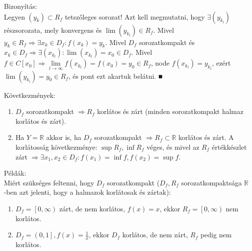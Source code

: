\documentclass[12pt,a4paper]{scrartcl}
\providecommand{\tightlist}{%
  \setlength{\itemsep}{0pt}\setlength{\parskip}{0pt}}
\newenvironment{bizonyitas}{}{}
\newenvironment{pelda}{}{}
\begin{document}
\begin{bizonyitas}

Bizonyítás:\\
Legyen \(\left( y_{k} \right) \subset R_{f}\) tetszőleges sorozat! Azt
kell megmutatni, hogy \(\exists\left( y_{k_{l}} \right)\) részsorozata,
mely konvergens és \(\lim\left( y_{k_{l}} \right) \in R_{f}\). Mivel
\(\left. y_{k} \in R_{f}\Rightarrow\exists x_{k} \in D_{f}:f\left( x_{k} \right) = y_{k} \right.\).
Mivel \(D_{f}\) sorozatkompakt és
\(\left. x_{k} \in D_{f}\Rightarrow\exists\left( x_{k_{l}} \right):\lim\left( x_{k_{l}} \right) = x_{0} \in D_{f} \right.\).
Mivel
\(\left. f \in C\left\lbrack x_{0} \right\rbrack\Rightarrow\underset{l\rightarrow\infty}{\lim}f\left( x_{k_{l}} \right) = f\left( x_{0} \right) = y_{0} \in R_{f} \right.\),
node \(f\left( x_{k_{l}} \right) = y_{k_{l}}\), ezért
\(\lim\left( y_{k_{l}} \right) = y_{0} \in R_{f}\), és pont ezt akartuk
belátni. ■

\end{bizonyitas}

Következmények:

\begin{enumerate}
\def\labelenumi{\arabic{enumi}.}
\tightlist
\item
  \(D_{f}\) sorozatkompakt \(\left. \Rightarrow R_{f} \right.\) korlátos
  és zárt (minden sorozatkompakt halmaz korlátos és zárt).
\item
  Ha \(Y = {\mathbb{R}}\) akkor is, ha \(D_{f}\) sorozatkompakt
  \(\left. \Rightarrow R_{f} \subset {\mathbb{R}} \right.\) korlátos és
  zárt. A korlátosság következménye: \(\sup R_{f},\inf R_{f}\) véges, és
  mivel az \(R_{f}\) értékkészlet zárt
  \(\left. \Rightarrow\exists x_{1},x_{2} \in D_{f}:f\left( x_{1} \right) = \inf f,f\left( x_{2} \right) = \sup f \right.\).
\end{enumerate}

\begin{pelda}

Példák:\\
Miért szükséges feltenni, hogy \(D_{f}\) sorozatkompakt (\(D_{f},R_{f}\)
sorozatkompaktsága \(\mathbb{R}\) -ben azt jelenti, hogy a halmazok
korlátosak és zártak):

\begin{enumerate}
\def\labelenumi{\arabic{enumi}.}
\tightlist
\item
  \(D_{f} = \left\lbrack {0,\infty} \right)\) zárt, de nem korlátos,
  \(f\left( x \right) = x\), ekkor
  \(R_{f} = \left\lbrack {0,\infty} \right)\) nem korlátos.
\item
  \(D_{f} = \left( 0,1 \right\rbrack,f\left( x \right) = \frac{1}{x}\),
  ekkor \(D_{f}\) korlátos, de nem zárt, \(R_{f}\) pedig nem korlátos.
\end{enumerate}

\end{pelda}
\end{document}
